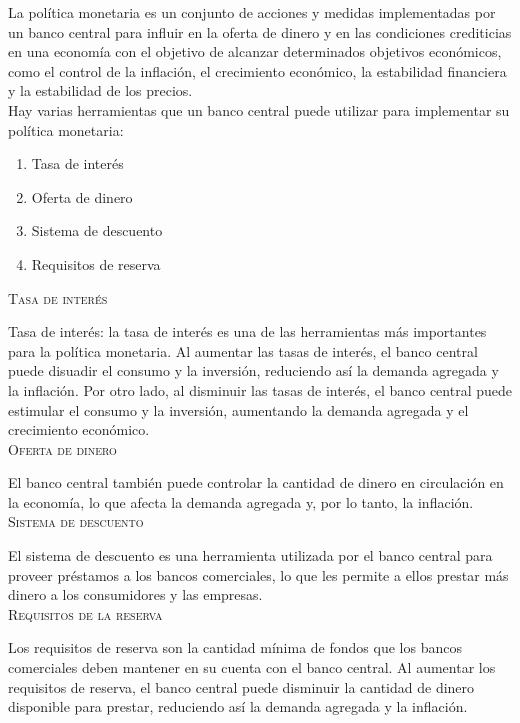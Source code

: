 La política monetaria es un conjunto de acciones y medidas implementadas por un banco central para influir en la oferta de dinero y en las condiciones crediticias en una economía con el objetivo de alcanzar determinados objetivos económicos, como el control de la inflación, el crecimiento económico, la estabilidad financiera y la estabilidad de los precios.\\ 

Hay varias herramientas que un banco central puede utilizar para implementar su política monetaria:\\

\begin{enumerate}
    \item Tasa de interés
    \item Oferta de dinero
    \item Sistema de descuento
    \item Requisitos de reserva
\end{enumerate}

\textsc{Tasa de interés}

Tasa de interés: la tasa de interés es una de las herramientas más importantes para la política monetaria. Al aumentar las tasas de interés, el banco central puede disuadir el consumo y la inversión, reduciendo así la demanda agregada y la inflación. Por otro lado, al disminuir las tasas de interés, el banco central puede estimular el consumo y la inversión, aumentando la demanda agregada y el crecimiento económico.\\

\textsc{Oferta de dinero}

El banco central también puede controlar la cantidad de dinero en circulación en la economía, lo que afecta la demanda agregada y, por lo tanto, la inflación.\\

\textsc{Sistema de descuento}

El sistema de descuento es una herramienta utilizada por el banco central para proveer préstamos a los bancos comerciales, lo que les permite a ellos prestar más dinero a los consumidores y las empresas.\\

\textsc{Requisitos de la reserva}

Los requisitos de reserva son la cantidad mínima de fondos que los bancos comerciales deben mantener en su cuenta con el banco central. Al aumentar los requisitos de reserva, el banco central puede disminuir la cantidad de dinero disponible para prestar, reduciendo así la demanda agregada y la inflación.\\

